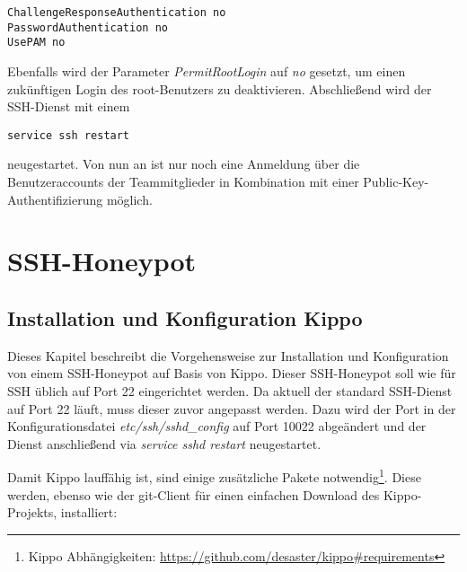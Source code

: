 \begin{lstlisting}[style=customc]
ChallengeResponseAuthentication no
PasswordAuthentication no
UsePAM no
\end{lstlisting}

Ebenfalls wird der Parameter \textit{PermitRootLogin} auf \textit{no} gesetzt, um einen zukünftigen Login des root-Benutzers zu deaktivieren. Abschließend wird der SSH-Dienst mit einem

\begin{lstlisting}[style=customc]
service ssh restart
\end{lstlisting}

neugestartet. Von nun an ist nur noch eine Anmeldung über die Benutzeraccounts der Teammitglieder in Kombination mit einer Public-Key-Authentifizierung möglich.

\section{SSH-Honeypot}
\label{sec:SSH-Honeypot}

\subsection{Installation und Konfiguration Kippo}
\label{subsec:Installation und Konfiguration Kippo}



Dieses Kapitel beschreibt die Vorgehensweise zur Installation und Konfiguration von einem SSH-Honeypot auf Basis von Kippo. Dieser SSH-Honeypot soll wie für SSH üblich auf Port 22 eingerichtet werden. Da aktuell der standard SSH-Dienst auf Port 22 läuft, muss dieser zuvor angepasst werden. Dazu wird der Port in der Konfigurationsdatei \textit{etc/ssh/sshd\_config} auf Port 10022 abgeändert und der Dienst anschließend via \textit{service sshd restart} neugestartet.

Damit Kippo lauffähig ist, sind einige zusätzliche Pakete notwendig\footnote{ Kippo Abhängigkeiten: \url{https://github.com/desaster/kippo\#requirements}}. Diese werden, ebenso wie der git-Client für einen einfachen Download des Kippo-Projekts, installiert:

